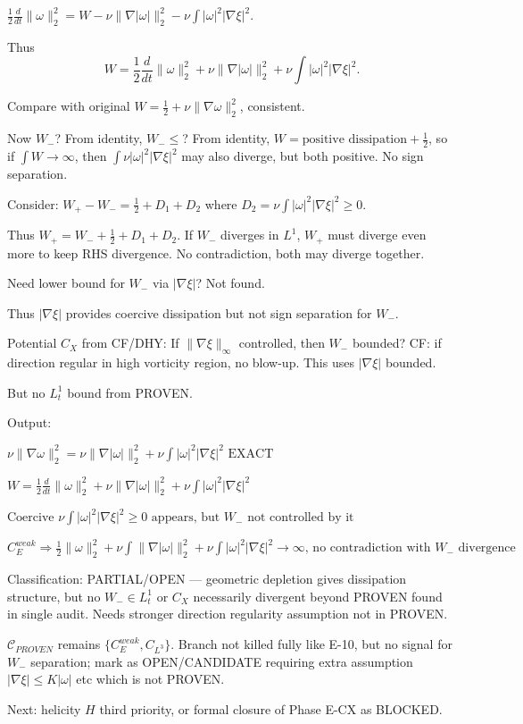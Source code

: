 \documentclass[11pt]{article}
\begin{document}
$\frac12\frac{d}{dt}\|\omega\|_2^2 = W -\nu\|\nabla|\omega|\|_2^2 -\nu\int|\omega|^2|\nabla\xi|^2$.

Thus
\begin{equation*}
\boxed{W = \frac12\frac{d}{dt}\|\omega\|_2^2 + \nu\|\nabla|\omega|\|_2^2 + \nu\int|\omega|^2|\nabla\xi|^2}.
\end{equation*}

Compare with original $W=\frac12\dot{}+\nu\|\nabla\omega\|_2^2$, consistent.

Now $W_-$? From identity, $W_- \le$? From identity, $W = \text{positive dissipation}+ \frac12\dot{}$, so if $\int W\to\infty$, then $\int \nu|\omega|^2|\nabla\xi|^2$ may also diverge, but both positive. No sign separation.

Consider: $W_+ - W_- = \frac12\dot{}+D_1+D_2$ where $D_2=\nu\int|\omega|^2|\nabla\xi|^2\ge0$.

Thus $W_+ = W_- + \frac12\dot{}+D_1+D_2$. If $W_-$ diverges in $L^1$, $W_+$ must diverge even more to keep RHS divergence. No contradiction, both may diverge together.

Need lower bound for $W_-$ via $|\nabla\xi|$? Not found.

Thus $|\nabla\xi|$ provides coercive dissipation but not sign separation for $W_-$.

Potential $C_X$ from CF/DHY: If $\|\nabla\xi\|_\infty$ controlled, then $W_-$ bounded? CF: if direction regular in high vorticity region, no blow-up. This uses $|\nabla\xi|$ bounded.

But no $L^1_t$ bound from PROVEN.

Output:

$\boxed{\nu\|\nabla\omega\|_2^2 = \nu\|\nabla|\omega|\|_2^2 + \nu\int|\omega|^2|\nabla\xi|^2\text{ EXACT}}$

$\boxed{W = \frac12\frac{d}{dt}\|\omega\|_2^2 + \nu\|\nabla|\omega|\|_2^2 + \nu\int|\omega|^2|\nabla\xi|^2}$

$\boxed{\text{Coercive } \nu\int|\omega|^2|\nabla\xi|^2\ge0\text{ appears, but }W_- \text{ not controlled by it}}$

$\boxed{C_E^{weak}\Rightarrow \frac12\|\omega\|_2^2+\nu\int\|\nabla|\omega|\|_2^2+\nu\int|\omega|^2|\nabla\xi|^2\to\infty\text{, no contradiction with }W_-\text{ divergence}}$

Classification: PARTIAL/OPEN — geometric depletion gives dissipation structure, but no $W_-\in L^1_t$ or $C_X$ necessarily divergent beyond PROVEN found in single audit. Needs stronger direction regularity assumption not in PROVEN.

$\mathcal{C}_{PROVEN}$ remains $\{C_E^{weak},C_{L^3}\}$. Branch not killed fully like E-10, but no signal for $W_-$ separation; mark as OPEN/CANDIDATE requiring extra assumption $|\nabla\xi|\le K|\omega|$ etc which is not PROVEN.

Next: helicity $H$ third priority, or formal closure of Phase E-CX as BLOCKED.
\end{document}
